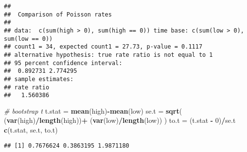 \documentclass[
]{article}
\newenvironment{Shaded}{\begin{snugshade}}{\end{snugshade}}
\newcommand{\CommentTok}[1]{\textcolor[rgb]{0.56,0.35,0.01}{\textit{#1}}}
\newcommand{\DecValTok}[1]{\textcolor[rgb]{0.00,0.00,0.81}{#1}}
\newcommand{\FunctionTok}[1]{\textcolor[rgb]{0.13,0.29,0.53}{\textbf{#1}}}
\newcommand{\NormalTok}[1]{#1}
\newcommand{\OtherTok}[1]{\textcolor[rgb]{0.56,0.35,0.01}{#1}}
\newcommand{\SpecialCharTok}[1]{\textcolor[rgb]{0.81,0.36,0.00}{\textbf{#1}}}
\begin{document}
\begin{verbatim}
## 
##  Comparison of Poisson rates
## 
## data:  c(sum(high > 0), sum(high == 0)) time base: c(sum(low > 0), sum(low == 0))
## count1 = 34, expected count1 = 27.73, p-value = 0.1117
## alternative hypothesis: true rate ratio is not equal to 1
## 95 percent confidence interval:
##  0.892731 2.774295
## sample estimates:
## rate ratio 
##   1.560386
\end{verbatim}

\begin{Shaded}
\begin{Highlighting}[]
\CommentTok{\# bootstrap t}
\NormalTok{t.stat }\OtherTok{=} \FunctionTok{mean}\NormalTok{(high)}\SpecialCharTok{{-}}\FunctionTok{mean}\NormalTok{(low)}
\NormalTok{se.t }\OtherTok{=} \FunctionTok{sqrt}\NormalTok{(}
\NormalTok{    (}\FunctionTok{var}\NormalTok{(high)}\SpecialCharTok{/}\FunctionTok{length}\NormalTok{(high))}\SpecialCharTok{+}
\NormalTok{    (}\FunctionTok{var}\NormalTok{(low)}\SpecialCharTok{/}\FunctionTok{length}\NormalTok{(low))}
\NormalTok{)}
\NormalTok{to.t }\OtherTok{=}\NormalTok{ (t.stat }\SpecialCharTok{{-}} \DecValTok{0}\NormalTok{)}\SpecialCharTok{/}\NormalTok{se.t}
\FunctionTok{c}\NormalTok{(t.stat, se.t, to.t)}
\end{Highlighting}
\end{Shaded}

\begin{verbatim}
## [1] 0.7676624 0.3863195 1.9871180
\end{verbatim}
\end{document}

